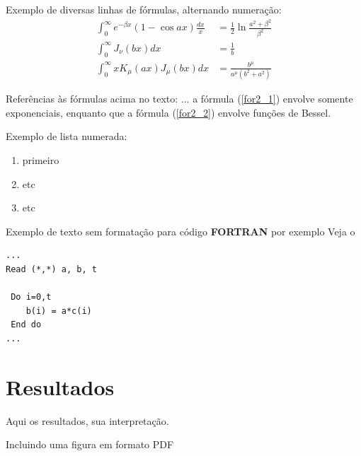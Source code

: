 Exemplo de diversas linhas de fórmulas, alternando numeração:
\begin{align}
\int_0^\infty e^{-\beta x} \left(1 - \cos ax\right) \frac{dx}{x} &= \frac{1}{2} \ln 
	\frac{a^2 + \beta^2}{\beta^2} \label{for2_1} \\
\int_0^\infty J_\nu \left(bx\right) dx &= \frac{1}{b} \nonumber \\
\int_0^\infty x K_\mu \left(ax\right) J_\mu \left(bx\right) dx &=
   \frac{b^\mu}{a^\mu \left(b^2 + a^2\right)} \label{for2_2}
\end{align}

Referências às fórmulas acima no texto: ... a fórmula (\ref{for2_1}) envolve somente exponenciais, enquanto que a fórmula (\ref{for2_2}) envolve funções de Bessel.

Exemplo de lista numerada:
\begin{enumerate}
  \item{ primeiro }
  \item{ etc }
  \item{ etc }
\end{enumerate}

\vspace{0.3cm}
Exemplo de texto sem formatação para código {\bf FORTRAN} por exemplo
Veja o %

\begin{verbatim}
...
Read (*,*) a, b, t

 Do i=0,t
    b(i) = a*c(i)
 End do
...

\end{verbatim}

\section{Resultados}
\vspace{2cm}
 Aqui os resultados, sua interpretação.

Incluindo uma figura em formato PDF

